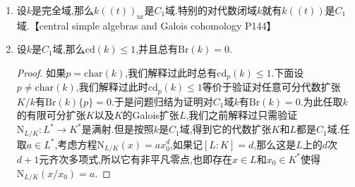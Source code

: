 \begin{enumerate}
\begin{proof}
    	按照上一条,问题归结为设$K=k(t)$.取正次齐次多项式$f\in k(t)[x_1,\cdots,x_n]$,满足次数$d=\deg f<n$.不妨设$f$的系数落在$k[t]$中,只需构造一个非零的$k[t]^n$中的解.取一个正整数$N$,取$x_i=\sum_{j=0}^Na_{ij}t^j$,其中$a_{ij}\in k$未定.考虑:
    	$$0=f(x_1,\cdots,x_n)=\sum_{l=0}^{dN+r}f_l(a_{10},\cdots,a_{nN})t^l$$
    	其中$r$是$f$的系数作为$k[t]$中元的次数的最大值,而$f_l$是$f$展开后关于$a_{ij}$的齐次多项式.按照$d<n$,可以让$N$足够大使得$dN+r+1<n(N+1)$,于是这些$f_l=0$定义了$\mathbb{P}^{n(N+1)-1}_k$的非空闭子集.按照$k$是代数闭域,这个非空闭子集有$k$有理点,这是满足$f_l=0$的一组$\{a_{ij}\}\subseteq k$.
    \end{proof}
    \item 设$k$是完全域,那么$k((t))_{\mathrm{nr}}$是$C_1$域.特别的对代数闭域$k$就有$k((t))$是$C_1$域.【central simple algebras and Galois cohomology P144】
    \item 设$k$是$C_1$域,那么$\mathrm{cd}(k)\le1$,并且总有$\mathrm{Br}(k)=0$.
    \begin{proof}
    	
    	如果$p=\mathrm{char}(k)$,我们解释过此时总有$\mathrm{cd}_p(k)\le1$.下面设$p\not=\mathrm{char}(k)$,我们解释过此时$\mathrm{cd}_p(k)\le1$等价于验证对任意可分代数扩张$K/k$有$\mathrm{Br}(k)\{p\}=0$.于是问题归结为证明对$C_1$域$k$有$\mathrm{Br}(k)=0$.为此任取$k$的有限可分扩张$K$以及$K$的Galois扩张$L$,我们之前解释过只需验证$\mathrm{N}_{L/K}:L^*\to K^*$是满射.但是按照$k$是$C_1$域,得到它的代数扩张$K$和$L$都是$C_1$域.任取$a\in L^*$,考虑方程$\mathrm{N}_{L/K}(x)=ax_0^d$,如果记$[L:K]=d$,那么这是$L$上的$d$次$d+1$元齐次多项式,所以它有非平凡零点,也即存在$x\in L$和$x_0\in K^*$使得$\mathrm{N}_{L/K}(x/x_0)=a$.
    \end{proof}
\end{enumerate}













